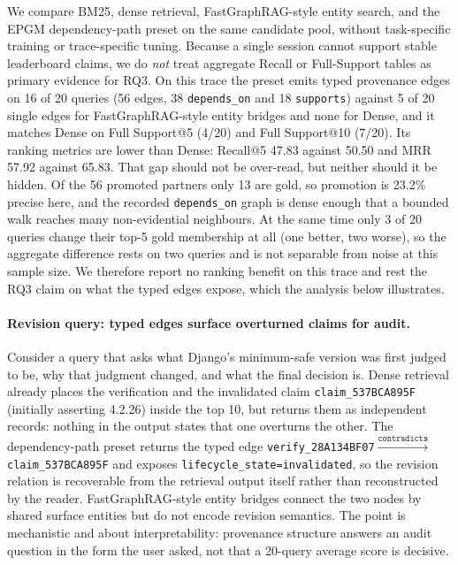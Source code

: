 We compare BM25, dense retrieval, FastGraphRAG-style entity search, and
the EPGM dependency-path preset on the same candidate pool, without
task-specific training or trace-specific tuning. Because a single session
cannot support stable leaderboard claims, we do \emph{not} treat aggregate
Recall or Full-Support tables as primary evidence for RQ3. On this trace the
preset emits typed provenance edges on 16 of 20 queries (56 edges, 38
\texttt{depends\_on} and 18 \texttt{supports}) against 5 of 20 single edges
for FastGraphRAG-style entity bridges and none for Dense, and it matches Dense
on Full Support@5 (4/20) and Full Support@10 (7/20). Its ranking metrics are
lower than Dense: Recall@5 47.83 against 50.50 and MRR 57.92 against 65.83.
That gap should not be over-read, but neither should it be hidden. Of the 56
promoted partners only 13 are gold, so promotion is 23.2\% precise here, and
the recorded \texttt{depends\_on} graph is dense enough that a bounded walk
reaches many non-evidential neighbours. At the same time only 3 of 20 queries
change their top-5 gold membership at all (one better, two worse), so the
aggregate difference rests on two queries and is not separable from noise at
this sample size. We therefore report no ranking benefit on this trace and
rest the RQ3 claim on what the typed edges expose, which the analysis below
illustrates.

\paragraph{Revision query: typed edges surface overturned claims for
audit.}
Consider a query that asks what Django's minimum-safe version was first
judged to be, why that judgment changed, and what the final decision is.
Dense retrieval already places the verification and the invalidated claim
\texttt{claim\_537BCA895F} (initially asserting 4.2.26) inside the top 10,
but returns them as independent records: nothing in the output states that
one overturns the other. The dependency-path preset returns the typed edge
\texttt{verify\_28A134BF07}$\xrightarrow{\texttt{contradicts}}$
\texttt{claim\_537BCA895F} and exposes
\texttt{lifecycle\_state=invalidated}, so the revision relation is
recoverable from the retrieval output itself rather than reconstructed by
the reader. FastGraphRAG-style entity bridges connect the two nodes by
shared surface entities but do not encode revision semantics. The point is
mechanistic and about interpretability: provenance structure answers an
audit question in the form the user asked, not that a 20-query average
score is decisive.

